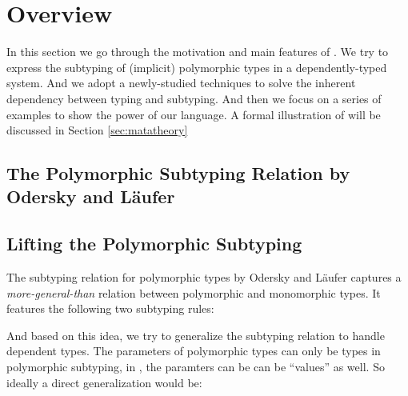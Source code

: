 \section{Overview}

In this section we go through the motivation and main features of \name. We
try to express the subtyping of (implicit) polymorphic types in a dependently-typed
system. And we adopt a newly-studied techniques to solve the inherent dependency
between typing and subtyping. And then we focus on a series of examples to show
the power of our language. A formal illustration of \name will be discussed in
Section \ref{sec:matatheory}

\subsection{The Polymorphic Subtyping Relation by Odersky and L\"aufer}

\subsection{Lifting the Polymorphic Subtyping}
\label{sec:polymorphic-subtyping}

The subtyping relation for polymorphic types by Odersky and L\"aufer\cite{odersky1996putting}
captures a \emph{more-general-than} relation between polymorphic and monomorphic
types. It features the following two subtyping rules:


And based on this idea, we try to generalize the subtyping relation to handle
dependent types. The parameters of polymorphic types can only be types in
polymorphic subtyping, in \name, the paramters can be can be ``values'' as well.
So ideally a direct generalization would be:


